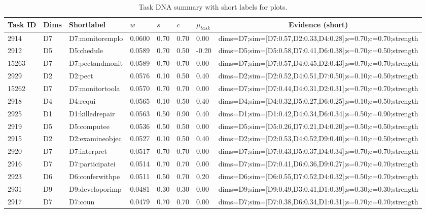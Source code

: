 \begin{table}[htbp]
\centering
\caption{Task DNA summary with short labels for plots.}
\label{tab:appendix_taskdna_shortlabel}
\begin{tabular}{@{}lllllllc@{}}
\toprule
Task ID & Dims & Shortlabel & $w$ & $s$ & $c$ & $\mu_{task}$ & Evidence (short) \\
\midrule
2914 & D7 & D7:monitoremplo & 0.0600 & 0.70 & 0.70 & 0.00 & dims=D7;sim=[D7:0.57,D2:0.33,D4:0.28];s=0.70;c=0.70;strength \\
2912 & D5 & D5:chedule & 0.0589 & 0.70 & 0.50 & -0.20 & dims=D5;sim=[D5:0.58,D7:0.41,D6:0.38];s=0.70;c=0.50;strength \\
15263 & D7 & D7:pectandmonit & 0.0589 & 0.70 & 0.70 & 0.00 & dims=D7;sim=[D7:0.57,D4:0.45,D2:0.43];s=0.70;c=0.70;strength \\
2929 & D2 & D2:pect & 0.0576 & 0.10 & 0.50 & 0.40 & dims=D2;sim=[D2:0.52,D4:0.51,D7:0.50];s=0.10;c=0.50;strength \\
15262 & D7 & D7:monitortoola & 0.0570 & 0.70 & 0.70 & 0.00 & dims=D7;sim=[D7:0.44,D4:0.31,D2:0.31];s=0.70;c=0.70;strength \\
2918 & D4 & D4:requi & 0.0565 & 0.10 & 0.50 & 0.40 & dims=D4;sim=[D4:0.32,D5:0.27,D6:0.25];s=0.10;c=0.50;strength \\
2925 & D1 & D1:killedrepair & 0.0563 & 0.50 & 0.90 & 0.40 & dims=D1;sim=[D1:0.42,D4:0.34,D6:0.34];s=0.50;c=0.90;strength \\
2919 & D5 & D5:computee & 0.0536 & 0.50 & 0.50 & 0.00 & dims=D5;sim=[D5:0.26,D7:0.21,D4:0.20];s=0.50;c=0.50;strength \\
2915 & D2 & D2:examineobjec & 0.0527 & 0.10 & 0.50 & 0.40 & dims=D2;sim=[D2:0.53,D4:0.52,D9:0.40];s=0.10;c=0.50;strength \\
2920 & D7 & D7:interpret & 0.0517 & 0.70 & 0.70 & 0.00 & dims=D7;sim=[D7:0.43,D5:0.37,D4:0.34];s=0.70;c=0.70;strength \\
2916 & D7 & D7:participatei & 0.0514 & 0.70 & 0.70 & 0.00 & dims=D7;sim=[D7:0.41,D6:0.36,D9:0.27];s=0.70;c=0.70;strength \\
2923 & D6 & D6:conferwithpe & 0.0511 & 0.50 & 0.70 & 0.20 & dims=D6;sim=[D6:0.55,D7:0.52,D4:0.32];s=0.50;c=0.70;strength \\
2931 & D9 & D9:developorimp & 0.0481 & 0.30 & 0.30 & 0.00 & dims=D9;sim=[D9:0.49,D3:0.41,D1:0.39];s=0.30;c=0.30;strength \\
2917 & D7 & D7:coun & 0.0479 & 0.70 & 0.70 & 0.00 & dims=D7;sim=[D7:0.38,D6:0.34,D1:0.31];s=0.70;c=0.70;strength \\

\end{tabular}
\end{table}
